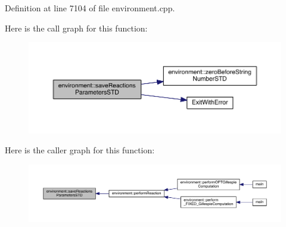 Definition at line 7104 of file environment.\-cpp.



Here is the call graph for this function\-:
\nopagebreak
\begin{figure}[H]
\begin{center}
\leavevmode
\includegraphics[width=350pt]{a00014_ad78fcf39a80e447a9aa2f84ab74335e5_cgraph}
\end{center}
\end{figure}




Here is the caller graph for this function\-:
\nopagebreak
\begin{figure}[H]
\begin{center}
\leavevmode
\includegraphics[width=350pt]{a00014_ad78fcf39a80e447a9aa2f84ab74335e5_icgraph}
\end{center}
\end{figure}


